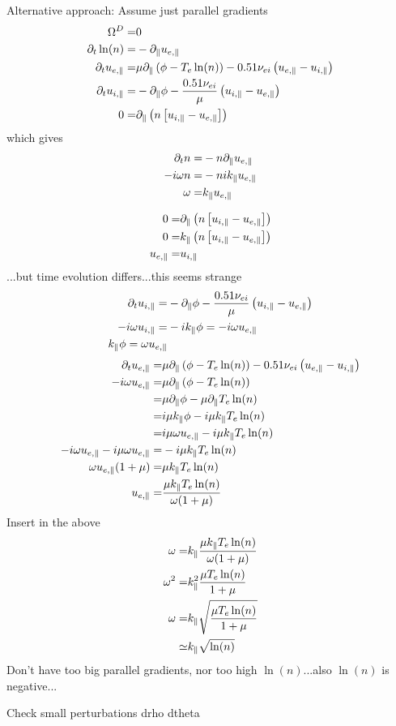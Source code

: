 Alternative approach:
Assume just parallel gradients
%
\begin{align*}
\Om^D =&
0
\\
%
%
%
\partial_t \ln(n)
=&
- \partial_\|u_{e,\|}
\\
%
%
%
\partial_t u_{e,\|}
 =&
 \mu \partial_\| \L(\phi - T_e  \ln(n)\R)
 - 0.51 \nu_{ei} \L(u_{e,\|}-u_{i,\|}\R)
\\
%
%
%
\partial_t u_{i,\|}
 =&
 - \partial_\|\phi
 - \frac{ 0.51 \nu_{ei} }{ \mu } \L(u_{i,\|}-u_{e,\|}\R)
\\
%
%
%
 0
  =&
 \partial_\| \L(n\L[ u_{i,\|} - u_{e,\|} \R]\R)
\end{align*}
%
which gives
%
\begin{align*}
    \partial_t n
=&
- n\partial_\|u_{e,\|}
\\
-i\omega n
=&
- nik_\|u_{e,\|}
\\
\omega
=&
k_\|u_{e,\|}
\end{align*}

\begin{align*}
 0
  =&
 \partial_\| \left(n\left[ u_{i,\|} - u_{e,\|} \right]\right)
 \\
 0
  =&
  k_\| \left(n\left[ u_{i,\|} - u_{e,\|} \right]\right)
 \\
 u_{e,\|}
  =&
  u_{i,\|}
\end{align*}
%
...but time evolution differs...this seems strange
%
\begin{align*}
\partial_t u_{i,\|}
 =&
 - \partial_\|\phi
 - \frac{ 0.51 \nu_{ei} }{ \mu } \left(u_{i,\|}-u_{e,\|}\right)
 \\
 -i\omega u_{i,\|}
 =&
 - ik_\|\phi
 =
 -i\omega u_{e,\|}
 \\
 k_\|\phi
 =
 \omega u_{e,\|}
\end{align*}
%
\begin{align*}
\partial_t u_{e,\|}
 =&
 \mu \partial_\| \left(\phi - T_e  \ln(n)\right)
 - 0.51 \nu_{ei} \left(u_{e,\|}-u_{i,\|}\right)
 \\
 -i\omega u_{e,\|}
 =&
 \mu \partial_\| \left(\phi - T_e  \ln(n)\right)
 \\
 =&
 \mu \partial_\| \phi
 - \mu \partial_\| T_e  \ln(n)
 \\
 =&
 i\mu k_\| \phi
 - i\mu k_\| T_e  \ln(n)
 \\
 =&
 i\mu  \omega u_{e,\|}
 - i\mu k_\| T_e  \ln(n)
 \\
 -i\omega u_{e,\|}
 - i\mu  \omega u_{e,\|}
 =&
 - i\mu k_\| T_e  \ln(n)
 \\
 \omega u_{e,\|}(1 + \mu)
 =&
 \mu k_\| T_e  \ln(n)
 \\
  u_{e,\|}
 =&
 \frac{\mu k_\| T_e  \ln(n)}{ \omega(1 + \mu) }
\end{align*}
%
Insert in the above
%
\begin{align*}
\omega
=&
k_\|\frac{\mu k_\| T_e  \ln(n)}{ \omega(1 + \mu) }
\\
\omega^2
=&
k_\|^2\frac{\mu T_e  \ln(n)}{ 1 + \mu }
\\
\omega
=&
k_\|\sqrt{\frac{\mu T_e  \ln(n)}{ 1 + \mu }}
\\
\simeq&
k_\|\sqrt{\ln(n)}
\end{align*}
%
Don't have too big parallel gradients, nor too high $\ln(n)$...also $\ln(n)$ is negative...

Check small perturbations
drho dtheta
